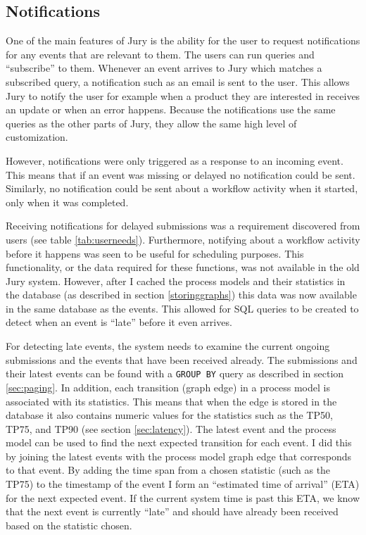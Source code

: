 \subsection{Notifications}
\label{sec:notifications}

One of the main features of Jury is the ability for the user to request notifications for any events that are relevant to them.
The users can run queries and ``subscribe'' to them.
Whenever an event arrives to Jury which matches a subscribed query, a notification such as an email is sent to the user.
This allows Jury to notify the user for example when a product they are interested in receives an update or when an error happens.
Because the notifications use the same queries as the other parts of Jury, they allow the same high level of customization.

However, notifications were only triggered as a response to an incoming event.
This means that if an event was missing or delayed no notification could be sent.
Similarly, no notification could be sent about a workflow activity when it started, only when it was completed.

Receiving notifications for delayed submissions was a requirement discovered from users (see table \ref{tab:userneeds}).
Furthermore, notifying about a workflow activity before it happens was seen to be useful for scheduling purposes.
This functionality, or the data required for these functions, was not available in the old Jury system.
However, after I cached the process models and their statistics in the database (as described in section \ref{storinggraphs}) this data was now available in the same database as the events.
This allowed for SQL queries to be created to detect when an event is ``late'' before it even arrives.

For detecting late events, the system needs to examine the current ongoing submissions and the events that have been received already.
The submissions and their latest events can be found with a \texttt{GROUP BY} query as described in section \ref{sec:paging}.
In addition, each transition (graph edge) in a process model is associated with its statistics. 
This means that when the edge is stored in the database it also contains numeric values for the statistics such as the TP50, TP75, and TP90 (see section \ref{sec:latency}).
The latest event and the process model can be used to find the next expected transition for each event.
I did this by joining the latest events with the process model graph edge that corresponds to that event.
By adding the time span from a chosen statistic (such as the TP75) to the timestamp of the event I form an ``estimated time of arrival'' (ETA) for the next expected event.
If the current system time is past this ETA, we know that the next event is currently ``late'' and should have already been received based on the statistic chosen.


